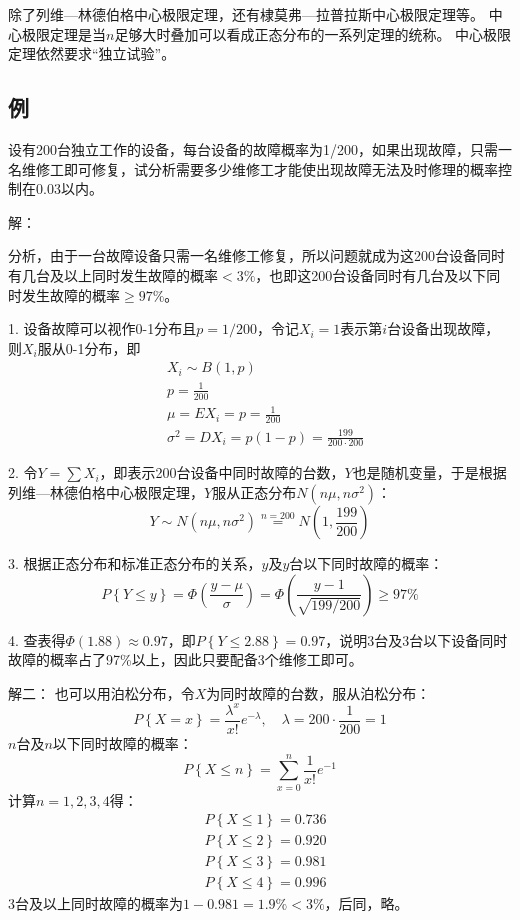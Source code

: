 除了列维—林德伯格中心极限定理，还有棣莫弗—拉普拉斯中心极限定理等。
中心极限定理是当$n$足够大时叠加可以看成正态分布的一系列定理的统称。
中心极限定理依然要求“独立试验”。

\subsection{例}

\begin{example}
设有200台独立工作的设备，每台设备的故障概率为1/200，如果出现故障，只需一名维修工即可修复，试分析需要多少维修工才能使出现故障无法及时修理的概率控制在0.03以内。
\end{example}

解：

分析，由于一台故障设备只需一名维修工修复，所以问题就成为这200台设备同时有几台及以上同时发生故障的概率$<3\%$，也即这200台设备同时有几台及以下同时发生故障的概率$\geqslant 97\%$。

1. 设备故障可以视作0-1分布且$p=1/200$，令记$X_i=1$表示第$i$台设备出现故障，则$X_i$服从0-1分布，即
\begin{align*}
&X_i\sim B\left( 1,p \right) \\
&p=\frac{1}{200} \\
&\mu =EX_i=p=\frac{1}{200} \\
&\sigma ^2=DX_i=p\left( 1-p \right) =\frac{199}{200\cdot 200}
\end{align*}

2. 令$Y=\sum{X_i}$，即表示200台设备中同时故障的台数，$Y$也是随机变量，于是根据列维—林德伯格中心极限定理，$Y$服从正态分布$N\left( n\mu ,n\sigma ^2 \right) $：
\[
Y\sim N\left( n\mu ,n\sigma ^2 \right) \overset{n=200}{=}N\left( 1,\frac{199}{200} \right)
\]

3. 根据正态分布和标准正态分布的关系，$y$及$y$台以下同时故障的概率：
\[
P\left\{ Y\leqslant y \right\} =\varPhi \left( \frac{y-\mu}{\sigma} \right) =\varPhi \left( \frac{y-1}{\sqrt{199/200}} \right) \geqslant 97\%
\]

4. 查表得$\varPhi \left( 1.88 \right) \approx 0.97$，即$P\left\{ Y\leqslant 2.88 \right\} =0.97$，说明3台及3台以下设备同时故障的概率占了97\%以上，因此只要配备3个维修工即可。

解二：
也可以用泊松分布，令$X$为同时故障的台数，服从泊松分布：
\[
P\left\{ X=x \right\} =\frac{\lambda ^x}{x!}e^{-\lambda},\quad \lambda =200\cdot \frac{1}{200}=1
\]
$n$台及$n$以下同时故障的概率：
\[
P\left\{ X\leqslant n \right\} =\sum_{x=0}^n{\frac{1}{x!}e^{-1}}
\]
计算$n=1,2,3,4$得：
\begin{align*}
&P\left\{ X\leqslant 1 \right\} =0.736 \\
&P\left\{ X\leqslant 2 \right\} =0.920 \\
&P\left\{ X\leqslant 3 \right\} =0.981 \\
&P\left\{ X\leqslant 4 \right\} =0.996
\end{align*}
3台及以上同时故障的概率为$1-0.981=1.9\%<3\%$，后同，略。

